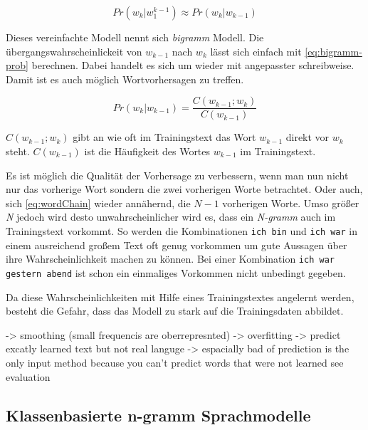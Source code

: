         \begin{equation}
        	Pr(w_k|w_1^{k-1}) \approx Pr(w_k|w_{k-1})
        	\label{eq:markov-assumtion}
        \end{equation}
        
        Dieses vereinfachte Modell nennt sich \emph{bigramm} Modell. Die übergangswahrscheinlickeit von \(w_{k-1}\) nach \(w_k\) lässt sich einfach mit \autoref{eq:bigramm-prob} berechnen. Dabei handelt es sich um \parencite[Abs.  3.8, Gleichung 3.9]{nlwp:book} wieder mit angepasster schreibweise. Damit ist es auch möglich Wortvorhersagen zu treffen.
        
        \begin{equation}
        	Pr(w_k|w_{k-1}) = \frac{C(w_{k-1};w_k)}{C(w_{k-1})}
        	\label{eq:bigramm-prob}
        \end{equation}
    	
    	\(C(w_{k-1};w_k)\) gibt an wie oft im Trainingstext das Wort \(w_{k-1}\) direkt vor \(w_k\) steht. \(C(w_{k-1})\) ist die Häufigkeit des Wortes \(w_{k-1}\) im Trainingstext.
        
        
        Es ist möglich die Qualität der Vorhersage zu verbessern, wenn man nun nicht nur das vorherige Wort sondern die zwei vorherigen Worte betrachtet. Oder auch, sich \autoref{eq:wordChain} wieder annähernd, die \(N - 1\) vorherigen Worte. Umso größer \emph{N} jedoch wird desto unwahrscheinlicher wird es, dass ein \emph{N-gramm} auch im Trainingstext vorkommt. So werden die Kombinationen \texttt{ich bin} und \texttt{ich war} in einem ausreichend großem Text oft genug vorkommen um gute Aussagen über ihre Wahrscheinlichkeit machen zu können. Bei einer Kombination \texttt{ich war gestern abend} ist schon ein einmaliges Vorkommen nicht unbedingt gegeben.
        
        Da diese Wahrscheinlichkeiten mit Hilfe eines Trainingstextes angelernt werden, besteht die Gefahr, dass das Modell zu stark auf die Trainingsdaten abbildet.
        
        -> smoothing (small frequencis are oberrepresnted)
        -> overfitting -> predict excatly learned text but not real languge
        -> espacially bad of prediction is the only input method because you can't predict words that were not learned see evaluation
        
    \newpage
	\subsection{Klassenbasierte n-gramm Sprachmodelle}
    \label{sec:brownClustering}
    
